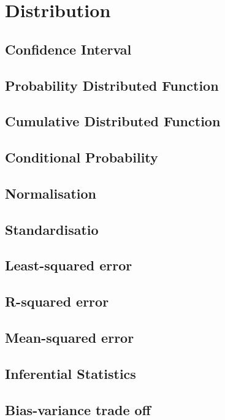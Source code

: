 \graphicspath{%
{chapter5graph/}%
{chapter5graph/bg/}}


\chapter{Distribution}



\section{Confidence Interval}

\section{Probability Distributed Function}

\section{Cumulative Distributed Function}

\section{Conditional Probability}

\section{Normalisation}

\section{Standardisatio}

\section{Least-squared error}

\section{R-squared error}

\section{Mean-squared error}

\section{Inferential Statistics}

\section{Bias-variance trade off}



